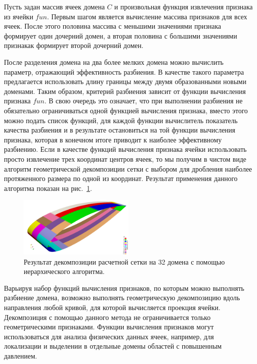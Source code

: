 Пусть задан массив ячеек домена $C$ и произвольная функция извлечения признака из ячейки $fun$.
Первым шагом является вычисление массива признаков для всех ячеек.
После этого половина массива с меньшими значениями признака формирует один дочерний домен, а вторая половина с большими значениями признакак формирует второй дочерний домен.

После разделения домена на два более мелких домена можно вычислить параметр, отражающий эффективность разбиения.
В качестве такого параметра предлагается использовать длину границы между двумя образованными новыми доменами.
Таким образом, критерий разбиения зависит от функции вычисления признака $fun$.
В свою очередь это означает, что при выполнении разбиения не обязательно ограничиваться одной функцией вычисления признака, вместо этого можно подать список функций, для каждой функции вычислитель показатель качества разбиения и в результате остановиться на той функции вычисления признака, которая в конечном итоге приводит к наиболее эффективному разбиению.
Если в качестве функций вычисления признака ячейки использовать просто извлечение трех координат центров ячеек, то мы получим в чистом виде алгоритм геометрической декомпозиции сетки с выбором для дробления наиболее протяженного размера по одной из координат.
Результат применения данного алгоритма показан на рис.~\ref{fig:text_2_decompsurf_wing_hierarchical_32}.

\begin{figure}[ht]
	\centering
	\includegraphics[width=0.5\textwidth]{./pics/text_2_decompsurf/wing_hierarchical_32.png}
	\caption{Результат декомпозиции расчетной сетки на 32 домена с помощью иерархического алгоритма.}
	\label{fig:text_2_decompsurf_wing_hierarchical_32}
\end{figure}

Варьируя набор функций вычисления признаков, по которым можно выполнять разбиение домена, возможно выполнять геометрическую декомпозицию вдоль направления любой кривой, для которой вычисляется проекция ячейки.
Декомпозиция с помощью данного метода не ограничивается только геометрическими признаками.
Функции вычисления признаков могут использоваться для анализа физических данных ячеек, например, для локализации и выделении в отдельные домены областей с повышенным давлением.

